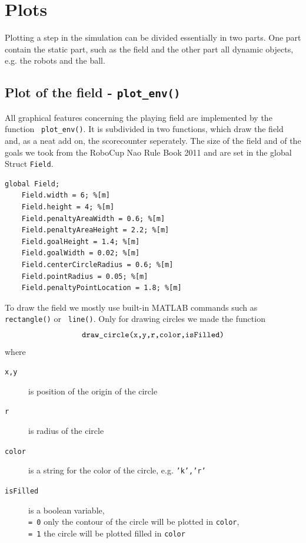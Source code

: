 \section{Plots}
Plotting a step in the simulation can be divided essentially in two parts. One part contain the static part, such as the field and the other part all dynamic objects, e.g. the robots and the ball.

\subsection*{Plot of the field - \texttt{plot\_env()} }
All graphical features concerning the playing field are implemented by the function \texttt{ plot\_env()}. It is subdivided in two functions, which draw the field and, as a neat add on, the scorecounter seperately. The size of the field and of the goals we took from the RoboCup Nao Rule Book 2011 and are set in the global Struct \texttt{Field}.
\begin{lstlisting}
global Field;
    Field.width = 6; %[m]
    Field.height = 4; %[m]
    Field.penaltyAreaWidth = 0.6; %[m]
    Field.penaltyAreaHeight = 2.2; %[m]
    Field.goalHeight = 1.4; %[m]
    Field.goalWidth = 0.02; %[m]
    Field.centerCircleRadius = 0.6; %[m]
    Field.pointRadius = 0.05; %[m]
    Field.penaltyPointLocation = 1.8; %[m]
\end{lstlisting}
\vspace{+10pt}

To draw the field we mostly use built-in MATLAB commands such as \texttt{ rectangle()} or \texttt{ line()}. Only for drawing circles we made the function
	\[ \textnormal{\texttt{draw\_circle(x,y,r,color,isFilled)}}
	\]
where
\begin{description}
	\item[\texttt{x,y}] is position of the origin of the circle
	\item[\texttt{r}] is radius of the circle
	\item[\texttt{color}] is a string for the color of the circle, e.g. \texttt{'k','r'}
	\item[\texttt{isFilled}] is a boolean variable,\\
	\texttt{= 0} only the contour of the circle will be plotted in \texttt{color},\\
	\texttt{= 1} the circle will be plotted filled in \texttt{color}
\end{description}

